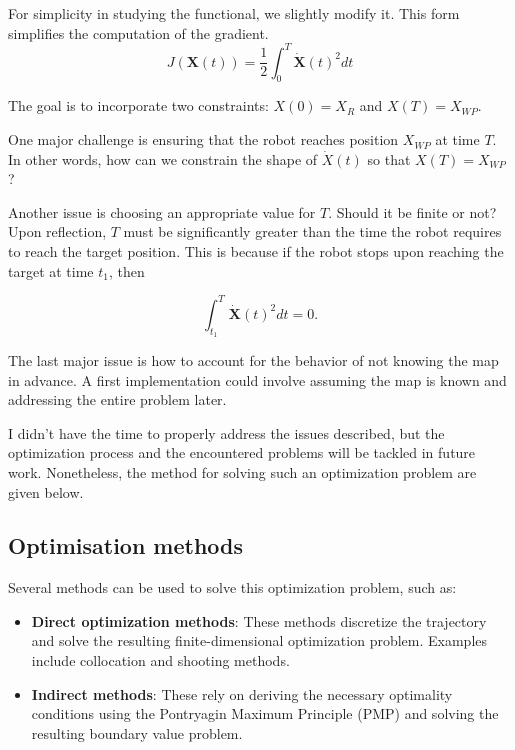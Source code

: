 \documentclass[../main.tex]{subfiles}
\begin{document}
\vspace{0.5em}

For simplicity in studying the functional, we slightly modify it. This form simplifies the computation of the gradient.
\begin{equation}
	\displaystyle
	J(\mathbf{X}(t)) = \frac{1}{2} \int_{0}^{T} \mathbf{\dot{X}}(t)^{2} dt
\end{equation}


The goal is to incorporate two constraints: $X(0) = X_R$ and $X(T) = X_{WP}$.  

One major challenge is ensuring that the robot reaches position $X_{WP}$ at time $T$. In other words, how can we constrain the shape of $\dot{X}(t)$ so that $X(T) = X_{WP}$?  

\vspace{0.5em}

Another issue is choosing an appropriate value for $T$. Should it be finite or not? Upon reflection, $T$ must be significantly greater than the time the robot requires to reach the target position. This is because if the robot stops upon reaching the target at time $t_1$, then 

$$
\int_{t_1}^{T} \mathbf{\dot{X}}(t)^{2} dt = 0.
$$

The last major issue is how to account for the behavior of not knowing the map in advance. A first implementation could involve assuming the map is known and addressing the entire problem later. 

\vspace{0.5em}

I didn't have the time to properly address the issues described, but the optimization process and the encountered problems will be tackled in future work. Nonetheless, the method for solving such an optimization problem are given below.

\subsection{Optimisation methods}

Several methods can be used to solve this optimization problem, such as\cite{trelat_2008}:  
\begin{itemize}
	\item \textbf{Direct optimization methods}: These methods discretize the trajectory and solve the resulting finite-dimensional optimization problem. Examples include collocation and shooting methods.  
	\item \textbf{Indirect methods}: These rely on deriving the necessary optimality conditions using the Pontryagin Maximum Principle (PMP) and solving the resulting boundary value problem. 
\end{itemize}
\end{document}
